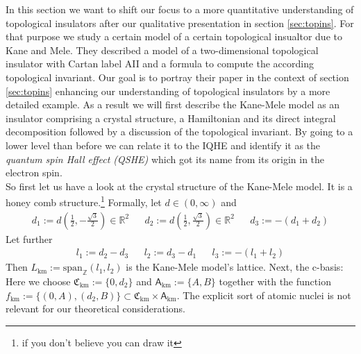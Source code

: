 \nocite{04d6b664}
\nocite{6ab9663f}
\nocite{f6db8935}
\nocite{fa76af21}
In this section we want to shift our focus to a more quantitative understanding of topological insulators after our qualitative presentation in section \ref{sec:topins}. For that purpose we study a certain model of a certain topological insualtor due to Kane and Mele. They described a model of a two-dimensional topological insulator with Cartan label AII and a formula to compute the according topological invariant. Our goal is to portray their paper \cite{04d6b664} in the context of section \ref{sec:topins} enhancing our understanding of topological insulators by a more detailed example. As a result we will first describe the Kane-Mele model as an insulator comprising a crystal structure, a Hamiltonian and its direct integral decomposition followed by a discussion of the topological invariant. By going to a lower level than before we can relate it to the IQHE and identify it as the \textit{quantum spin Hall effect (QSHE)} which got its name from its origin in the electron spin.
\\
So first let us have a look at the crystal structure of the Kane-Mele model. It is a {\glqq}honey comb{\grqq} structure.\footnote{if you don't believe you can draw it} Formally, let $d \in (0,\infty)$ and
\begin{align*}
  d_{1}
  :=
  d
  \left(
    \frac{1}{2},
    -\frac{\sqrt{3}}{2}
  \right)
  \in
  \mathbb{R}^{2}
  &&
  d_{2}
  :=
  d
  \left(
    \frac{1}{2},
    \frac{\sqrt{3}}{2}
  \right)
  \in
  \mathbb{R}^{2}
  &&
  d_{3}
  :=
  -
  (d_{1} + d_{2})
\end{align*}
Let further
\begin{align*}
  l_{1}
  :=
  d_{2}
  -
  d_{3}
  &&
  l_{2}
  :=
  d_{3}
  -
  d_{1}
  &&
  l_{3}
  :=
  -
  (l_{1}+l_{2})
\end{align*}
Then $L_{\textrm{km}} := \mathrm{span}_{\mathbb{Z}}(l_{1},l_{2})$ is the Kane-Mele model's lattice. Next, the c-basis: Here we choose $\mathfrak{C}_{\textrm{km}} := \lbrace 0,d_{2} \rbrace$ and $\mathsf{A}_{\textrm{km}} := \lbrace A,B \rbrace$ together with the function $f_{\textrm{km}} := \lbrace (0,A),(d_{2},B) \rbrace \subset \mathfrak{C}_{\textrm{km}} \times \mathsf{A}_{\textrm{km}}$. The explicit sort of atomic nuclei is not relevant for our theoretical considerations.
\\
